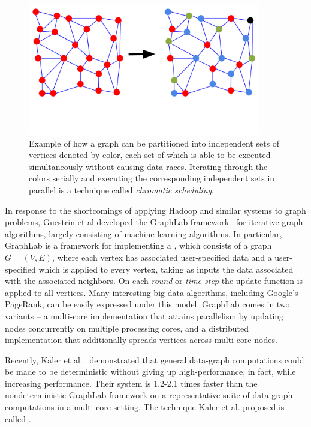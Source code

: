 \begin{figure}[h]
\centering
\includegraphics[width=4in,clip,trim=0 3cm 0 0]{figures/chromatic_scheduling.pdf}
\caption{Example of how a graph can be partitioned into 
independent sets of vertices denoted by color, each set of which is able to
be executed simultaneously without causing data races.  Iterating
through the colors serially and executing the corresponding
independent sets in parallel is a technique called \emph{chromatic scheduling}.}
\label{fig:chromatic_scheduling}
\end{figure}

In response to the shortcomings of applying Hadoop and similar systems
to graph problems, 
Guestrin et al developed the GraphLab 
framework~\cite{LowBiGo12} for iterative graph algorithms, 
largely consisting of machine learning algorithms. 
In particular, GraphLab is a framework for implementing a
, which consists of a graph $G=(V,E)$,
where each vertex has associated user-specified data and a user-specified 
 which is applied to every vertex, taking
as inputs the data associated with the associated neighbors.  On each
\emph{round} or \emph{time step} the update function is applied to
all vertices.  Many interesting big data algorithms, including Google's 
PageRank, can be easily expressed under this model. GraphLab 
comes in two variants -- a multi-core implementation that 
attains parallelism by updating nodes concurrently on multiple 
processing cores, and a distributed implementation that 
additionally spreads vertices across multi-core nodes.



Recently, Kaler et al.~\cite{KalerHaSc14} demonstrated that general
data-graph computations could be made to be deterministic without
giving up high-performance, in fact, while increasing performance.
Their system  is 1.2-2.1 times faster than
the nondeterministic GraphLab framework on a representative suite of data-graph
computations in a multi-core setting.  The technique Kaler et al. proposed
is called .  


